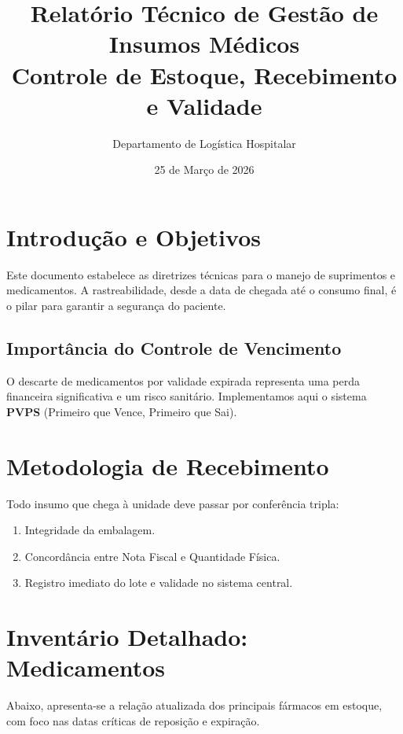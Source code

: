 \documentclass[12pt,a4paper]{article}
\title{\textbf{Relatório Técnico de Gestão de Insumos Médicos}\\ \large Controle de Estoque, Recebimento e Validade}
\author{Departamento de Logística Hospitalar}
\date{25 de Março de 2026}
\begin{document}
\maketitle
\newpage

\tableofcontents
\newpage

\section{Introdução e Objetivos}
Este documento estabelece as diretrizes técnicas para o manejo de suprimentos e medicamentos. A rastreabilidade, desde a data de chegada até o consumo final, é o pilar para garantir a segurança do paciente.

\subsection{Importância do Controle de Vencimento}
O descarte de medicamentos por validade expirada representa uma perda financeira significativa e um risco sanitário. Implementamos aqui o sistema \textbf{PVPS} (Primeiro que Vence, Primeiro que Sai).

\section{Metodologia de Recebimento}
Todo insumo que chega à unidade deve passar por conferência tripla:
\begin{enumerate}
    \item Integridade da embalagem.
    \item Concordância entre Nota Fiscal e Quantidade Física.
    \item Registro imediato do lote e validade no sistema central.
\end{enumerate}

\newpage

\section{Inventário Detalhado: Medicamentos}
Abaixo, apresenta-se a relação atualizada dos principais fármacos em estoque, com foco nas datas críticas de reposição e expiração.
\end{document}
